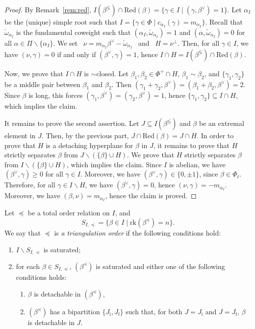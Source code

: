 \documentclass[ALCO,published]{cedram}
\theoremstyle{plain}
\newcommand\smeno{\smallsetminus}
\newcommand\rk{\mathrm{rk}}
\newcommand\al{\alpha}
\newcommand\be{\beta}
\newcommand\ga{\gamma}
\newcommand\comp{\lessgtr}
\newcommand\red{\mathrm{Red}}
\newcommand\preq{\preccurlyeq}
\begin{document}
\begin{proof}
By Remark~\ref{rem:red}, $I(\be^{\comp})\cap \red(\be)=\{\ga\in I \mid (\ga, \be^\vee)=1\}$.
Let $\al_I$ be the (unique) simple root such that $I=\{\ga\in \Phi\mid c_{\al_I}(\ga)=m_{\al_I}\}$. 
Recall that $\check\omega_{\al_I}$ is the fundamental coweight such that $(\al_I, \check\omega_{\al_I})=1$ and $(\al, \check\omega_{\al_I})=0$ for all $\al\in \Pi\smeno \{\al_I\}$.
We set \ $\nu=m_{\al_I}\be^\vee-\check\omega_{\al_I}$ \ and \ $H=\nu^\perp$.
Then, for all $\ga\in I$,  we have $(\nu, \ga)=0$ if and only if $(\be^\vee, \ga)=1$, hence $I\cap H= I(\be^{\comp})\cap \red(\be)$.

\par 
Now, we prove that $I\cap H$ is $\sim$closed. 
Let $\be_1, \be_2\in \Phi^+\cap H$, $\be_1\sim\be_2$, and $\{\ga_1,\ga_2\}$ be a middle pair between $\be_1$ and $\be_2$.
Then $(\ga_1+\ga_2, \be^\vee)=(\be_1+\be_2, \be^\vee)=2$. 
Since $\be$ is long, this forces $(\ga_1, \be^\vee)=(\ga_2, \be^\vee)=1$, hence $\{\ga_1,\ga_2\}\subseteq I \cap H$, which implies the claim.

\par
It remains to prove the second assertion.
Let $J\subseteq I(\be^{\comp})$ and $\be$ be an extremal element in $J$.
Then, by  the previous part, $J\cap \red(\be)= J\cap H$.
In order to prove that $H$ is a detaching hyperplane for $\be$ in $J$, it remains to prove that $H$ strictly  separates $\be$ from $J\smeno (\{\be\}\cup H)$.
We prove that $H$ strictly  separates $\be$ from $I\smeno (\{\be\}\cup H)$, which implies the claim.
Since $I$ is abelian, we have $(\be^\vee, \ga)\geq 0$ for all $\ga\in I$.
Moreover, we have $(\be^\vee, \ga)\in \{0, \pm 1\}$, since $\be\in \Phi_\ell$.
Therefore, for all $\ga\in I\smeno H$,  we have $(\be^\vee, \ga)=0$, hence  $(\nu, \ga)=-m_{\al_I}$.
Moreover,  we have $(\be, \nu)=m_{\al_I}$, hence the claim is proved.
\end{proof}

\begin{defi}\label{def:triang-order}
Let 
$\preccurlyeq$ be a total order relation on $I$,  and 
$$
S_{I,\preq}=\{\be\in I\mid \rk(\be^\preq)=n\}.
$$ 
We say that $\preq$ is {\em a triangulation order} if the following conditions hold:
\begin{enumerate}
\item\label{itm:interno}
$I\smeno S_{I,\preq}$ is saturated; 
\item\label{itm:esterno}
for each $\be\in S_{I,\preq}$,  $(\be^\preq)$ is saturated and either one of the following conditions holds:
\begin{enumerate}[label=\textup{(\alph*)}]
\item $\be$ is detachable in  $(\be^\preq)$,  
\item $(\be^\preq)$ has a bipartition $\{J_{\mathrm i}, J_{\mathrm f}\}$ such that,  for both $J=J_{\mathrm i}$ and $J=J_{\mathrm f}$, $\be$ is detachable in $J$.%
\end{enumerate}
\end{enumerate}
\end{defi}
\end{document}
